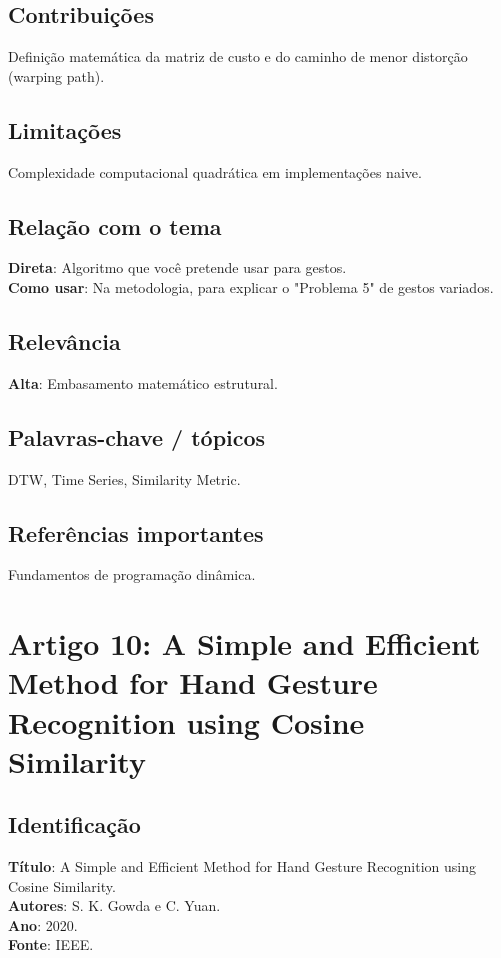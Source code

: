 \documentclass[12pt, a4paper]{article}
\begin{document}
\subsection{Contribuições}
Definição matemática da matriz de custo e do caminho de menor distorção (warping path).\\
\subsection{Limitações}
Complexidade computacional quadrática em implementações naive.\\
\subsection{Relação com o tema}
\textbf{Direta}: Algoritmo que você pretende usar para gestos.\\
\textbf{Como usar}: Na metodologia, para explicar o "Problema 5" de gestos variados.\\
\subsection{Relevância}
\textbf{Alta}: Embasamento matemático estrutural.\\
\subsection{Palavras-chave / tópicos}
DTW, Time Series, Similarity Metric.\\
\subsection{Referências importantes}
Fundamentos de programação dinâmica.
\newpage

\section{Artigo 10: A Simple and Efficient Method for Hand Gesture Recognition using Cosine Similarity}
\subsection{Identificação}
\textbf{Título}: A Simple and Efficient Method for Hand Gesture Recognition using Cosine Similarity.\\
\textbf{Autores}: S. K. Gowda e C. Yuan.\\
\textbf{Ano}: 2020.\\
\textbf{Fonte}: IEEE.\\
\end{document}
